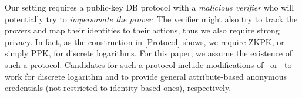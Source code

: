 Our setting requires a public-key \ac{DB} protocol with a \emph{malicious verifier} who will potentially try to \emph{impersonate the prover}.
The verifier might also try to track the provers and map their identities to 
their actions, thus we also require strong privacy.
In fact, as the construction in \cref{Protocol} shows, we require  
\ac{ZKPK}, or simply \ac{PPK}, for discrete logarithms.
For this paper, we assume the existence of such a protocol. Candidates for such 
a protocol include modifications of~\cite{ProProx} or~\cite{PROPS} to work for 
discrete logarithm and to provide general attribute-based anonymous credentials 
(not restricted to identity-based ones), respectively.

